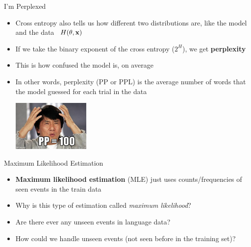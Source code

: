 \documentclass{beamer}
\newcommand{\detail}[1]{{\color{lightgrey}\small{}#1}}
\begin{document}
\begin{frame}{I'm Perplexed}
\begin{itemize}
	\item Cross entropy also tells us how different two distributions are, like the model and the data \ \detail{$H(\theta, {\bf x})$}
	\pause
	\item If we take the binary exponent of the cross entropy ($2^H$), we get \textbf{perplexity}
	\pause
	\item This is how confused the model is, on average
	\pause
	\item In other words, perplexity (PP or PPL) is the average number of words that the model guessed for each trial in the data
	\pause
	\begin{center}
		\vspace*{0.5em}
		\includegraphics[width=0.3\textwidth]{images/jackie_chan_perplexity.jpg}
	 \end{center}
\end{itemize}
\end{frame}



\begin{frame}{Maximum Likelihood Estimation}
\begin{itemize}
	\item \textbf{Maximum likelihood estimation} (MLE) just uses counts/frequencies of seen events in the train data
	\item Why is this type of estimation called \textit{maximum likelihood}?
	\pause
	\item Are there ever any unseen events in language data?
	\pause
	\item How could we handle unseen events (not seen before in the training set)?
\end{itemize}
\end{frame}


\end{document}
